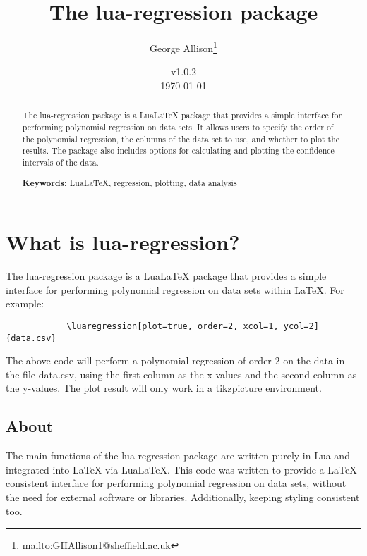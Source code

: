 \documentclass[11pt]{article}
\title{The {\ttfamily lua-regression} package}
\author{George Allison\thanks{\href{mailto:GHAllison1@sheffield.ac.uk}{\ttfamily mailto:GHAllison1@sheffield.ac.uk}}}
\date{v1.0.2\\ \today}
\begin{document}
    \maketitle
    
    \begin{abstract}
        The {\ttfamily lua-regression} package is a Lua\LaTeX{} package that provides a simple interface for performing polynomial regression on data sets.
        It allows users to specify the order of the polynomial regression, the columns of the data set to use, and whether to plot the results.
        The package also includes options for calculating and plotting the confidence intervals of the data.

        \vspace{1em}
        
        \textbf{Keywords:} LuaLaTeX, regression, plotting, data analysis
    \end{abstract}

    \tableofcontents

    \pagebreak

    \section{What is {\ttfamily lua-regression}?}

    The {\ttfamily lua-regression} package is a Lua\LaTeX{} package that provides a simple interface for performing polynomial regression on data sets within \LaTeX{}. For example:

	\begin{codebox}
		\begin{verbatim}
			\luaregression[plot=true, order=2, xcol=1, ycol=2]{data.csv}
		\end{verbatim}
	\end{codebox}

    
    The above code will perform a polynomial regression of order 2 on the data in the file {\ttfamily data.csv}, using the first column as the x-values and the second column as the y-values.
    The plot result will only work in a tikzpicture environment.


    \subsection{About}

    The main functions of the {\ttfamily lua-regression} package are written purely in Lua and integrated into \LaTeX{} via Lua\LaTeX{}.
    This code was written to provide a \LaTeX{} consistent interface for performing polynomial regression on data sets, without the need for external software or libraries.
    Additionally, keeping styling consistent too.
    
\end{document}
